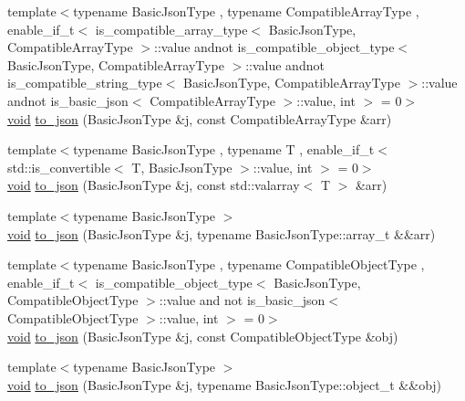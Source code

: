 \begin{DoxyCompactItemize}
{\footnotesize template$<$typename Basic\+Json\+Type , typename Compatible\+Array\+Type , enable\+\_\+if\+\_\+t$<$ is\+\_\+compatible\+\_\+array\+\_\+type$<$ Basic\+Json\+Type, Compatible\+Array\+Type $>$\+::value andnot is\+\_\+compatible\+\_\+object\+\_\+type$<$ Basic\+Json\+Type, Compatible\+Array\+Type $>$\+::value andnot is\+\_\+compatible\+\_\+string\+\_\+type$<$ Basic\+Json\+Type, Compatible\+Array\+Type $>$\+::value andnot is\+\_\+basic\+\_\+json$<$ Compatible\+Array\+Type $>$\+::value, int $>$  = 0$>$ }\\\hyperlink{namespacenlohmann_1_1detail_a59fca69799f6b9e366710cb9043aa77d}{void} \hyperlink{namespacenlohmann_1_1detail_a3afebc132c5ff83f9cd160e52030fdfd}{to\+\_\+json} (Basic\+Json\+Type \&j, const Compatible\+Array\+Type \&arr)
\item 
{\footnotesize template$<$typename Basic\+Json\+Type , typename T , enable\+\_\+if\+\_\+t$<$ std\+::is\+\_\+convertible$<$ T, Basic\+Json\+Type $>$\+::value, int $>$  = 0$>$ }\\\hyperlink{namespacenlohmann_1_1detail_a59fca69799f6b9e366710cb9043aa77d}{void} \hyperlink{namespacenlohmann_1_1detail_a7f7c7b9760161b774cdc0b4b838fae64}{to\+\_\+json} (Basic\+Json\+Type \&j, const std\+::valarray$<$ T $>$ \&arr)
\item 
{\footnotesize template$<$typename Basic\+Json\+Type $>$ }\\\hyperlink{namespacenlohmann_1_1detail_a59fca69799f6b9e366710cb9043aa77d}{void} \hyperlink{namespacenlohmann_1_1detail_aa0fd1b5788e9ba37e31da43dda738cb5}{to\+\_\+json} (Basic\+Json\+Type \&j, typename Basic\+Json\+Type\+::array\+\_\+t \&\&arr)
\item 
{\footnotesize template$<$typename Basic\+Json\+Type , typename Compatible\+Object\+Type , enable\+\_\+if\+\_\+t$<$ is\+\_\+compatible\+\_\+object\+\_\+type$<$ Basic\+Json\+Type, Compatible\+Object\+Type $>$\+::value and not is\+\_\+basic\+\_\+json$<$ Compatible\+Object\+Type $>$\+::value, int $>$  = 0$>$ }\\\hyperlink{namespacenlohmann_1_1detail_a59fca69799f6b9e366710cb9043aa77d}{void} \hyperlink{namespacenlohmann_1_1detail_a24c9c12f3839c94e09532f08de85e949}{to\+\_\+json} (Basic\+Json\+Type \&j, const Compatible\+Object\+Type \&obj)
\item 
{\footnotesize template$<$typename Basic\+Json\+Type $>$ }\\\hyperlink{namespacenlohmann_1_1detail_a59fca69799f6b9e366710cb9043aa77d}{void} \hyperlink{namespacenlohmann_1_1detail_ac9f7a5542851c61d93740148eaec509f}{to\+\_\+json} (Basic\+Json\+Type \&j, typename Basic\+Json\+Type\+::object\+\_\+t \&\&obj)

\end{DoxyCompactItemize}
